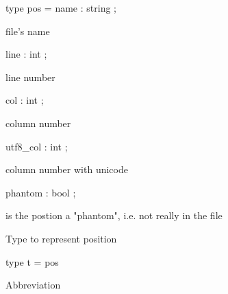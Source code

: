 \documentclass[11pt]{article}
\begin{document}
\label{type:Position.pos}\begin{ocamldoccode}
type pos = 
{}  name : string ;
\end{ocamldoccode}
\begin{ocamldoccomment}
file's name


\end{ocamldoccomment}
\begin{ocamldoccode}
  line : int ;
\end{ocamldoccode}
\begin{ocamldoccomment}
line number


\end{ocamldoccomment}
\begin{ocamldoccode}
  col : int ;
\end{ocamldoccode}
\begin{ocamldoccomment}
column number


\end{ocamldoccomment}
\begin{ocamldoccode}
  utf8_col : int ;
\end{ocamldoccode}
\begin{ocamldoccomment}
column number with unicode


\end{ocamldoccomment}
\begin{ocamldoccode}
  phantom : bool ;
\end{ocamldoccode}
\begin{ocamldoccomment}
is the postion a "phantom", i.e. not really
                                in the file


\end{ocamldoccomment}
\begin{ocamldoccode}
{}
\end{ocamldoccode}
\begin{ocamldocdescription}
Type to represent position


\end{ocamldocdescription}




\label{type:Position.t}\begin{ocamldoccode}
type t = pos 
\end{ocamldoccode}
\begin{ocamldocdescription}
Abbreviation


\end{ocamldocdescription}
\end{document}

